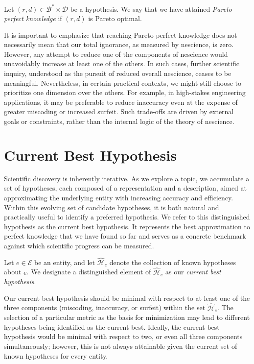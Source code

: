 \begin{definition}
Let $(r, d) \in \mathcal{B}^\ast \times \mathcal{D}$ be a hypothesis. We say that we have attained \emph{Pareto perfect knowledge} if $(r, d)$ is Pareto optimal.
\end{definition}

It is important to emphasize that reaching Pareto perfect knowledge does not necessarily mean that our total ignorance, as measured by nescience, is zero. However, any attempt to reduce one of the components of nescience would unavoidably increase at least one of the others. In such cases, further scientific inquiry, understood as the pursuit of reduced overall nescience, ceases to be meaningful. Nevertheless, in certain practical contexts, we might still choose to prioritize one dimension over the others. For example, in high-stakes engineering applications, it may be preferable to reduce inaccuracy even at the expense of greater miscoding or increased surfeit. Such trade-offs are driven by external goals or constraints, rather than the internal logic of the theory of nescience.

%
%

\section{Current Best Hypothesis}

Scientific discovery is inherently iterative. As we explore a topic, we accumulate a set of hypotheses, each composed of a representation and a description, aimed at approximating the underlying entity with increasing accuracy and efficiency. Within this evolving set of candidate hypotheses, it is both natural and practically useful to identify a preferred hypothesis. We refer to this distinguished hypothesis as the current best hypothesis. It represents the best approximation to perfect knowledge that we have found so far and serves as a concrete benchmark against which scientific progress can be measured.

\begin{definition}
Let $e \in \mathcal{E}$ be an entity, and let $\hat{\mathcal{H}}_e$ denote the collection of known hypotheses about $e$. We designate a distinguished element of $\hat{\mathcal{H}}_e$ as our \emph{current best hypothesis}.
\end{definition}

Our current best hypothesis should be minimal with respect to at least one of the three components (miscoding, inaccuracy, or surfeit) within the set $\hat{\mathcal{H}}_e$. The selection of a particular metric as the basis for minimization may lead to different hypotheses being identified as the current best. Ideally, the current best hypothesis would be minimal with respect to two, or even all three components simultaneously; however, this is not always attainable given the current set of known hypotheses for every entity.

